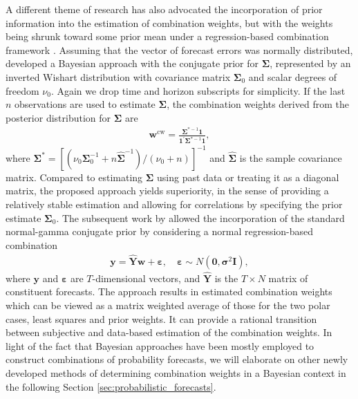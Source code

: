 \documentclass[11pt]{article}
\begin{document}
A different theme of research has also advocated the incorporation of prior information into the estimation of combination weights, but with the weights being shrunk toward some prior mean under a regression-based combination framework \citep{Newbold2002-wa}. Assuming that the vector of forecast errors was normally distributed, \cite{Clemen1986-pd} developed a Bayesian approach with the conjugate prior for $\boldsymbol{\Sigma}$, represented by an inverted Wishart distribution with covariance matrix $\boldsymbol{\Sigma}_{0}$ and scalar degrees of freedom $\nu_{0}$. Again we drop time and horizon subscripts for simplicity. If the last $n$ observations are used to estimate $\boldsymbol{\Sigma}$, the combination weights derived from the posterior distribution for $\boldsymbol{\Sigma}$ are
\begin{align*}
\boldsymbol{w}^{\text{cw}}=\frac{\boldsymbol{\Sigma}^{*-1}\mathbf{1}}{\mathbf{1}^{\prime} \boldsymbol{\Sigma}^{*-1} \mathbf{1}},
\end{align*}
where $\boldsymbol{\Sigma}^{*}=\left[\left(\nu_{0} \boldsymbol{\Sigma}_{0}^{-1}+n \hat{\boldsymbol{\Sigma}}^{-1}\right) /(\nu_{0}+n)\right]^{-1}$ and $\hat{\boldsymbol{\Sigma}}$ is the sample covariance matrix.
Compared to estimating $\boldsymbol{\Sigma}$ using past data or treating it as a diagonal matrix, the proposed approach yields superiority, in the sense of providing a relatively stable estimation and allowing for correlations by specifying the prior estimate $\boldsymbol{\Sigma}_{0}$. The subsequent work by \cite{Diebold1990-fk} allowed the incorporation of the standard normal-gamma conjugate prior by considering a normal regression-based combination
\begin{align*}
\mathbf{y}=\hat{\mathbf{Y}} \boldsymbol{w}+\boldsymbol{\varepsilon}, \quad \boldsymbol{\varepsilon} \sim N\left(\mathbf{0}, \boldsymbol{\sigma}^{2} \mathbf{I}\right),
\end{align*}
where $\mathbf{y}$ and $\boldsymbol{\varepsilon}$ are $T$-dimensional vectors, and $\hat{\mathbf{Y}}$ is the $T \times N$ matrix of constituent forecasts. The approach results in estimated combination weights which can be viewed as a matrix weighted average of those for the two polar cases, least squares and prior weights. It can provide a rational transition between subjective and data-based estimation of the combination weights. In light of the fact that Bayesian approaches have been mostly employed to construct combinations of probability forecasts, we will elaborate on other newly developed methods of determining combination weights in a Bayesian context in the following Section \ref{sec:probabilistic_forecasts}.
\end{document}
